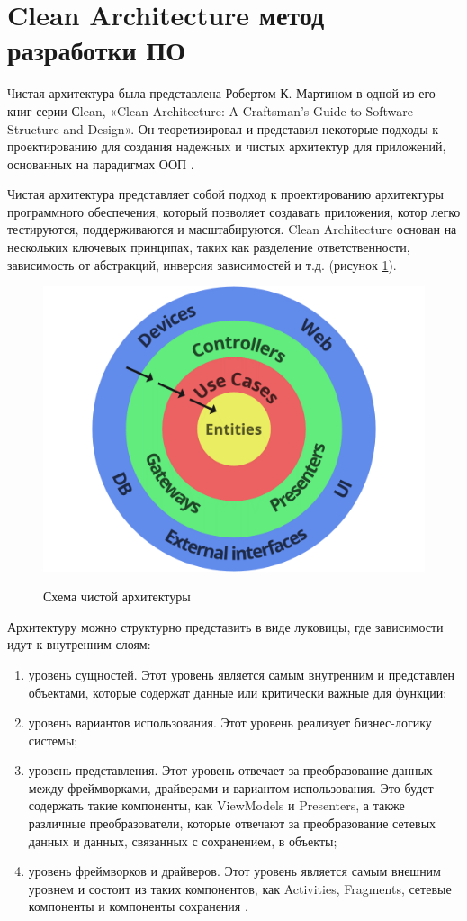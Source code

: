 \section{Clean Architecture метод разработки ПО}

Чистая архитектура была представлена Робертом К. Мартином в одной из его книг серии Сlean, «Clean Architecture: A Craftsman's Guide to Software Structure and Design». Он теоретизировал и представил некоторые подходы к проектированию для создания надежных и чистых архитектур для приложений, основанных на парадигмах ООП \cite{clean}. 

Чистая архитектура представляет собой подход к проектированию архитектуры программного обеспечения, который позволяет создавать приложения, котор легко тестируются, поддерживаются и масштабируются. Clean Architecture основан на нескольких ключевых принципах, таких как разделение ответственности, зависимость от абстракций, инверсия зависимостей и т.д. (рисунок \ref{fig:CleanArchScheme}).

\begin{figure}[h!]
    \begin{center}
        \includegraphics[width=0.45\hsize]{fig/clean.png}\\[2mm]
        \caption{Схема чистой архитектуры}\label{fig:CleanArchScheme}
    \end{center}
\end{figure}

Архитектуру можно структурно представить в виде луковицы, где зависимости идут к внутренним слоям:
\begin{enumerate}
    \item уровень сущностей. Этот уровень является самым внутренним и представлен объектами, которые содержат данные или критически важные для функции;
    \item уровень вариантов использования. Этот уровень реализует бизнес-логику системы;
    \item уровень представления. Этот уровень отвечает за преобразование данных между фреймворками, драйверами и вариантом использования. Это будет содержать такие компоненты, как ViewModels и Presenters, а также различные преобразователи, которые отвечают за преобразование сетевых данных и данных, связанных с сохранением, в объекты;
    \item уровень фреймворков и драйверов. Этот уровень является самым внешним уровнем и состоит из таких компонентов, как Activities, Fragments, сетевые компоненты и компоненты сохранения \cite{CleanArch}.
\end{enumerate}

